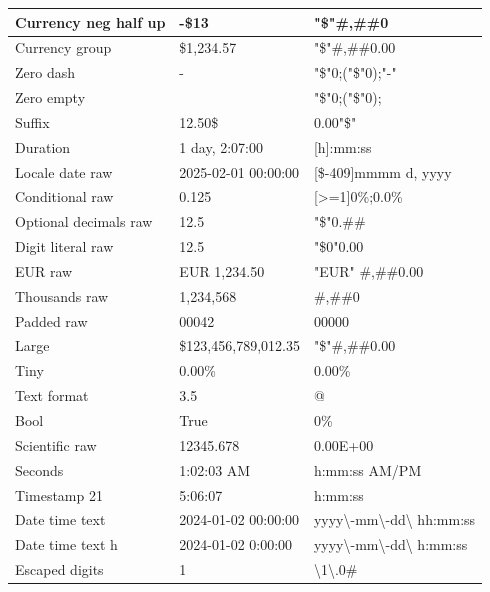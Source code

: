 \documentclass[11pt,a4paper]{article}
\begin{document}
\begin{table}[h]
\begin{tabular}{|l|l|l|}
Currency neg half up & -\$13 & "\$"\#,\#\#0 \\ \hline
Currency group & \$1,234.57 & "\$"\#,\#\#0.00 \\ \hline
Zero dash & - & "\$"0;("\$"0);"-" \\ \hline
Zero empty &  & "\$"0;("\$"0); \\ \hline
Suffix & 12.50\$ & 0.00"\$" \\ \hline
Duration & 1 day, 2:07:00 & [h]:mm:ss \\ \hline
Locale date raw & 2025-02-01 00:00:00 & [\$-409]mmmm d, yyyy \\ \hline
Conditional raw & 0.125 & [>=1]0\%;0.0\% \\ \hline
Optional decimals raw & 12.5 & "\$"0.\#\# \\ \hline
Digit literal raw & 12.5 & "\$0"0.00 \\ \hline
EUR raw & EUR 1,234.50 & "EUR" \#,\#\#0.00 \\ \hline
Thousands raw & 1,234,568 & \#,\#\#0 \\ \hline
Padded raw & 00042 & 00000 \\ \hline
Large & \$123,456,789,012.35 & "\$"\#,\#\#0.00 \\ \hline
Tiny & 0.00\% & 0.00\% \\ \hline
Text format & 3.5 & @ \\ \hline
Bool & True & 0\% \\ \hline
Scientific raw & 12345.678 & 0.00E+00 \\ \hline
Seconds & 1:02:03 AM & h:mm:ss AM/PM \\ \hline
Timestamp 21 & 5:06:07 & h:mm:ss \\ \hline
Date time text & 2024-01-02 00:00:00 & yyyy\textbackslash{}-mm\textbackslash{}-dd\textbackslash{} hh:mm:ss \\ \hline
Date time text h & 2024-01-02 0:00:00 & yyyy\textbackslash{}-mm\textbackslash{}-dd\textbackslash{} h:mm:ss \\ \hline
Escaped digits & 1 & \textbackslash{}1\textbackslash{}.0\# \\ \hline
\end{tabular}
\end{table}
\end{document}
